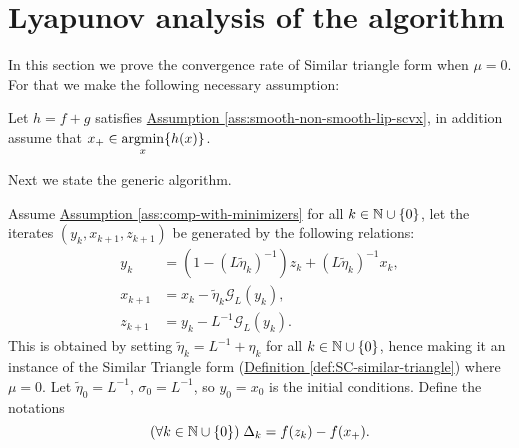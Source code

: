 \documentclass[12pt]{article}
\begin{document}
        
\section{Lyapunov analysis of the algorithm}
    In this section we prove the convergence rate of Similar triangle form when $\mu = 0$. 
    For that we make the following necessary assumption: 
    \begin{assumption}\label{ass:comp-with-minimizers}
        Let $h = f + g$ satisfies 
        \hyperref[ass:smooth-non-smooth-lip-scvx]
        {Assumption \ref*{ass:smooth-non-smooth-lip-scvx}}, 
        in addition assume that $x_+ \in \mathop{\rm argmin}\limits_x \{h(x)\}$. 
    \end{assumption}
    Next we state the generic algorithm. 
    \begin{definition}
        \label{def:similar-triangle-to-prove}
        Assume
        \hyperref[ass:comp-with-minimizers]
        {Assumption \ref*{ass:comp-with-minimizers}}
        for all $k\in \mathbb N \cup \{0\}$, let the iterates $(y_k, x_{k + 1}, z_{k +1})$ be generated by the following relations: 
        \begin{align}
            y_k &= (1 - (L\tilde \eta_k)^{-1}) z_k + (L\tilde \eta_k)^{-1} x_k, 
            \\
            x_{k + 1} &= x_k - \tilde \eta_k \mathcal G_L(y_k), 
            \\
            z_{k + 1} &= y_k - L^{-1} \mathcal G_L(y_k). 
            \label{eqn:similar-triangle-to-prove}
        \end{align}
        This is obtained by setting $\tilde \eta_k = L^{-1} + \eta_k$ for all $k \in \mathbb N\cup \{0\}$, hence making it an instance of the Similar Triangle form 
        (\hyperref[def:SC-similar-triangle]
            {Definition \ref*{def:SC-similar-triangle}}) 
        where $\mu =0$. 
        Let $\tilde \eta_0 = L^{-1}$, $\sigma_0 = L^{-1}$, so $y_0 = x_0$ is the initial conditions. 
        Define the notations 
        $$
            (\forall k \in \mathbb N \cup \{0\})\; \Delta_k = f(z_k) - f(x_+). 
        $$
    \end{definition}
    
\end{document}
